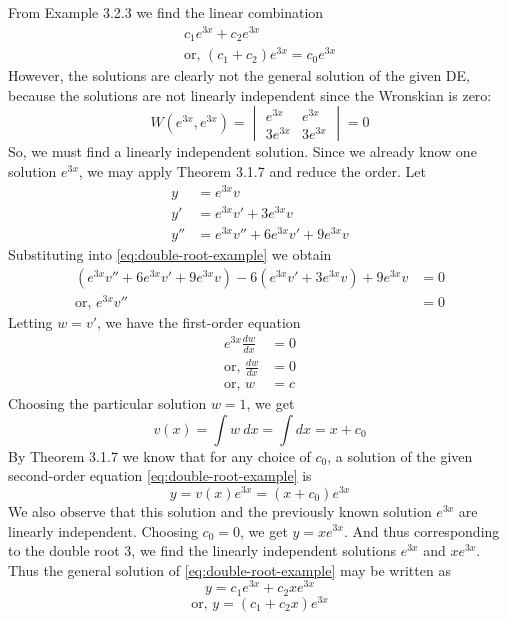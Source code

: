 From Example 3.2.3 we find the linear combination
\begin{align*}
    c_1e^{3x} + c_2e^{3x} \\
    \text{or, } (c_1 + c_2)e^{3x} = c_0e^{3x}
\end{align*}
However, the solutions are clearly not the general solution of the given DE, because the solutions are not linearly independent since the Wronskian is zero:\[
    W(e^{3x}, e^{3x}) =
    \begin{vmatrix}
        e^{3x} & e^{3x} \\
        3e^{3x} & 3e^{3x}
    \end{vmatrix} = 0
\]
So, we must find a linearly independent solution. Since we already know one solution $e^{3x}$, we may apply Theorem 3.1.7 and reduce the order. Let
\begin{align*}
    y &= e^{3x}v \\
    y' &= e^{3x}v' + 3e^{3x}v \\
    y'' &= e^{3x}v'' + 6e^{3x}v' + 9e^{3x}v
\end{align*}
Substituting into \eqref{eq:double-root-example} we obtain
\begin{align*}
    ( e^{3x}v'' + 6e^{3x}v' + 9e^{3x}v ) - 6( e^{3x}v' + 3e^{3x}v ) + 9e^{3x}v &= 0 \\
    \text{or, } e^{3x}v'' &= 0
\end{align*}
Letting $w = v'$, we have the first-order equation
\begin{align*}
    e^{3x}\frac{dw}{dx} &= 0 \\
    \text{or, } \frac{dw}{dx} &= 0 \\
    \text{or, } w &= c
\end{align*}
Choosing the particular solution $w = 1$, we get \[
    v(x) = \int{w} \: d{x} = \int{} d{x} = x + c_0
\]
By Theorem 3.1.7 we know that for any choice of $c_0$, a solution of the given second-order equation \eqref{eq:double-root-example} is \[
    y = v(x)e^{3x} = (x + c_0)e^{3x}
\] We also observe that this solution and the previously known solution $e^{3x}$ are linearly independent. Choosing $c_0 = 0$, we get $y = xe^{3x}$. And thus corresponding to the double root 3, we find the linearly independent solutions $e^{3x}$ and $xe^{3x}$.
Thus the general solution of \eqref{eq:double-root-example} may be written as \[
    y = c_1e^{3x} + c_2xe^{3x} \]
\[ \text{or, } y = (c_1 + c_2x)e^{3x} \]

